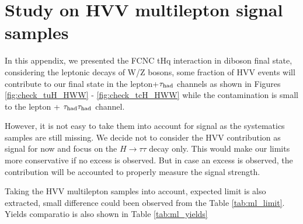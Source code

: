 \section{Study on HVV multilepton signal samples}
\label{sec:HVVML}

In this appendix, we presented the FCNC tHq interaction in diboson final state, considering the leptonic decays of W/Z bosons, some fraction of HVV events will contribute to our final state in the lepton+$\tau_\text{had}$ channels as shown in Figures \ref{fig:check_tuH_HWW} - \ref{fig:check_tcH_HWW} while the contamination is
small to the lepton + $\tau_\text{had}{}\tau_\text{had}$ channel.

However, it is not easy to take them into account for signal as the systematics samples are still missing. We decide not to consider the HVV contribution as signal for now
and focus on the $H\rightarrow \tau\tau$ decay only. This would make our limits more conservative if no excess is observed. But in case an excess is observed, the contribution will be accounted to properly measure the signal strength.

Taking the HVV multilepton samples into account, expected limit is also extracted, small difference could been observed from the Table \ref{tab:ml_limit}. Yields comparatio is also shown in Table \ref{tab:ml_yields} 



